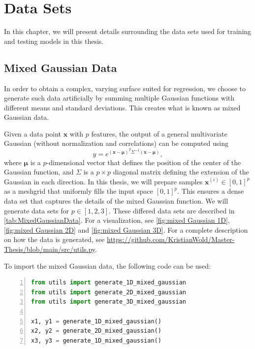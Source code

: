 \chapter{Data Sets}\label{sec:Appendix B}
In this chapter, we will present details surrounding the data sets used for training and testing models in this thesis. 

\section{Mixed Gaussian Data}\label{sec:Mixed Gaussian Data}
In order to obtain a complex, varying surface suited for regression, we choose to generate such data artificially by summing multiple Gaussian functions with different means and standard deviations. This creates what is known as mixed Gaussian data. 

Given a data point $\boldsymbol{x}$ with $p$ features, the output of a general multivariate Gaussian (without normalization and correlations) can be computed using 
\begin{equation}\label{eq:Gaussian}
    y = e^{(\boldsymbol{x} - \boldsymbol{\mu})^T \Sigma^{-1}(\boldsymbol{x} - \boldsymbol{\mu})},
\end{equation}
where $\boldsymbol{\mu}$ is a $p$-dimensional vector that defines the position of the center of the Gaussian function, and $\Sigma$ is a $p\times p$ diagonal matrix defining the extension of the Gaussian in each direction. In this thesis, we will prepare samples $\boldsymbol{x}^{(i)} \in [0,1]^p$ as a meshgrid that uniformly fills the input space $[0,1]^p$. This ensures a dense data set that captures the details of the mixed Gaussian function. We will generate data sets for $p \in[1,2,3].$ These differed data sets are described in \autoref{tab:MixedGaussianData}. For a visualization, see \autoref{fig:mixed Gaussian 1D}, \autoref{fig:mixed Gaussian 2D} and \autoref{fig:mixed Gaussian 3D}. For a complete description on how the data is generated, see \url{https://github.com/KristianWold/Master-Thesis/blob/main/src/utils.py}.

To import the mixed Gaussian data, the following code can be used:
\begin{lstlisting}[language=python, numbers=left]
from utils import generate_1D_mixed_gaussian
from utils import generate_2D_mixed_gaussian
from utils import generate_3D_mixed_gaussian

x1, y1 = generate_1D_mixed_gaussian()
x2, y2 = generate_2D_mixed_gaussian()
x3, y3 = generate_1D_mixed_gaussian()
\end{lstlisting}

